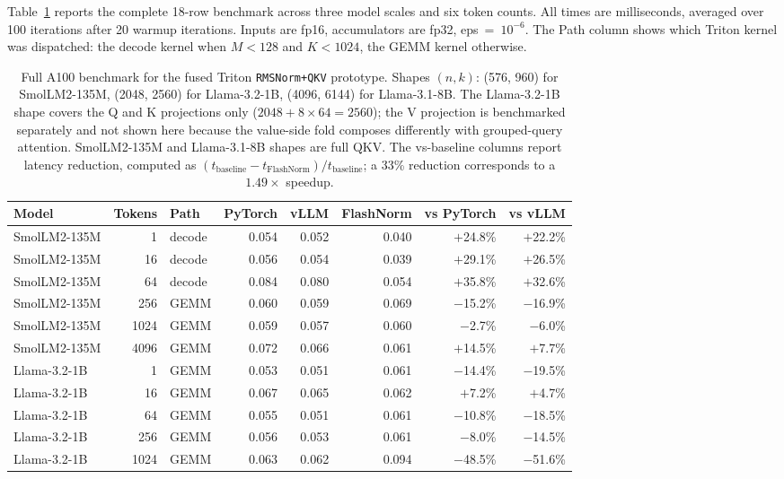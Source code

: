 \documentclass{article}
\begin{document}
Table~\ref{tab:a100-full} reports the complete 18-row benchmark across three model scales and six token counts. All times are milliseconds, averaged over 100 iterations after 20 warmup iterations. Inputs are fp16, accumulators are fp32, eps~=~$10^{-6}$. The Path column shows which Triton kernel was dispatched: the decode kernel when $M < 128$ and $K < 1024$, the GEMM kernel otherwise.

\begin{table}[h!] \centering
\caption{Full A100 benchmark for the fused Triton \texttt{RMSNorm+QKV} prototype. Shapes $(n, k)$: (576, 960) for SmolLM2-135M, (2048, 2560) for Llama-3.2-1B, (4096, 6144) for Llama-3.1-8B. The Llama-3.2-1B shape covers the Q and K projections only ($2048 + 8{\times}64 = 2560$); the V projection is benchmarked separately and not shown here because the value-side fold composes differently with grouped-query attention. SmolLM2-135M and Llama-3.1-8B shapes are full QKV. The vs-baseline columns report latency reduction, computed as $(t_{\text{baseline}} - t_{\text{FlashNorm}})/t_{\text{baseline}}$; a 33\% reduction corresponds to a $1.49\times$ speedup.}
\label{tab:a100-full}
\small
\begin{tabular}{l r l r r r r r}
\hline
Model & Tokens & Path & PyTorch & vLLM & FlashNorm & vs PyTorch & vs vLLM \\
\hline
SmolLM2-135M & 1    & decode & 0.054 & 0.052 & 0.040 & $+$24.8\% & $+$22.2\% \\
SmolLM2-135M & 16   & decode & 0.056 & 0.054 & 0.039 & $+$29.1\% & $+$26.5\% \\
SmolLM2-135M & 64   & decode & 0.084 & 0.080 & 0.054 & $+$35.8\% & $+$32.6\% \\
SmolLM2-135M & 256  & GEMM   & 0.060 & 0.059 & 0.069 & $-$15.2\% & $-$16.9\% \\
SmolLM2-135M & 1024 & GEMM   & 0.059 & 0.057 & 0.060 & $-$2.7\%  & $-$6.0\%  \\
SmolLM2-135M & 4096 & GEMM   & 0.072 & 0.066 & 0.061 & $+$14.5\% & $+$7.7\%  \\
\hline
Llama-3.2-1B & 1    & GEMM   & 0.053 & 0.051 & 0.061 & $-$14.4\% & $-$19.5\% \\
Llama-3.2-1B & 16   & GEMM   & 0.067 & 0.065 & 0.062 & $+$7.2\%  & $+$4.7\%  \\
Llama-3.2-1B & 64   & GEMM   & 0.055 & 0.051 & 0.061 & $-$10.8\% & $-$18.5\% \\
Llama-3.2-1B & 256  & GEMM   & 0.056 & 0.053 & 0.061 & $-$8.0\%  & $-$14.5\% \\
Llama-3.2-1B & 1024 & GEMM   & 0.063 & 0.062 & 0.094 & $-$48.5\% & $-$51.6\% \\

\end{tabular}
\end{table}
\end{document}

